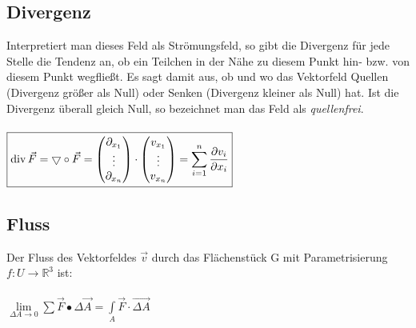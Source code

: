\subsection{Divergenz}
  Interpretiert man dieses Feld als Strömungsfeld, so gibt die Divergenz für jede
  Stelle die Tendenz an, ob ein Teilchen in der Nähe zu diesem Punkt hin- bzw.
  von diesem Punkt wegfließt. Es sagt damit aus, ob und wo das Vektorfeld Quellen
  (Divergenz größer als Null) oder Senken (Divergenz kleiner als Null) hat. Ist
  die Divergenz überall gleich Null, so bezeichnet man das Feld als
  \textit{quellenfrei}.\\\\
  $\boxed{\operatorname{div} \vec{F}=\bigtriangledown\circ \vec{F}=
	\begin{pmatrix}
    	\partial_{x_1}\\
    	\vdots\\
    	\partial_{x_n}
    \end{pmatrix}\cdot
	\begin{pmatrix}
    	v_{x_1}\\
    	\vdots\\
    	v_{x_n}
  \end{pmatrix}=
  \sum\limits_{i=1}^n \dfrac{\partial v_i}{\partial x_i}}$

\subsection{Fluss}
  Der Fluss des Vektorfeldes $\vec{v}$ durch das Flächenstück G mit
  Parametrisierung $f:U\rightarrow\mathbb{R}^3$ ist:\\\\
  $\boxed{\lim\limits_{\Delta A \to 0}\sum \vec F \bullet \Delta\vec A = \int\limits_A \vec F \cdot \vec{\Delta A}}$


